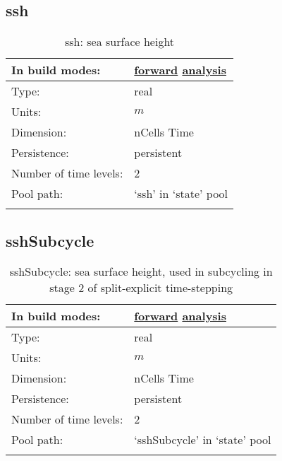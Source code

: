 \subsection[ssh]{ssh}
\label{subsec:var_sec_state_ssh}
\begin{center}
\begin{longtable}{| p{2.0in} | p{4.0in} |}
        \hline 
        In build modes: & \hyperref[subsec:forward_var_tab_state]{forward} \hyperref[subsec:analysis_var_tab_state]{analysis} \\
        \hline 
        Type: & real \\
        \hline 
        Units: & $m$ \\
        \hline 
        Dimension: & nCells Time \\
        \hline 
        Persistence: & persistent \\
        \hline 
        Number of time levels: & 2 \\
        \hline 
            Pool path: & `ssh' in `state' pool \\
		 \hline 
    \caption{ssh: sea surface height}
\end{longtable}
\end{center}
\subsection[sshSubcycle]{sshSubcycle}
\label{subsec:var_sec_state_sshSubcycle}
\begin{center}
\begin{longtable}{| p{2.0in} | p{4.0in} |}
        \hline 
        In build modes: & \hyperref[subsec:forward_var_tab_state]{forward} \hyperref[subsec:analysis_var_tab_state]{analysis} \\
        \hline 
        Type: & real \\
        \hline 
        Units: & $m$ \\
        \hline 
        Dimension: & nCells Time \\
        \hline 
        Persistence: & persistent \\
        \hline 
        Number of time levels: & 2 \\
        \hline 
            Pool path: & `sshSubcycle' in `state' pool \\
		 \hline 
    \caption{sshSubcycle: sea surface height, used in subcycling in stage 2 of split-explicit time-stepping}
\end{longtable}
\end{center}
